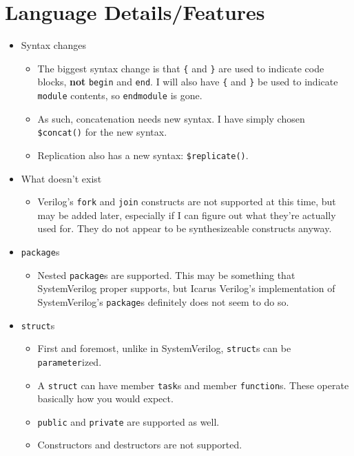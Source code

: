 \documentclass{article}
\begin{document}
	\section{Language Details/Features}
		\begin{itemize}
		\item Syntax changes
			\begin{itemize}
			\item The biggest syntax change is that \texttt{\{} and
			\texttt{\}} are used to indicate code blocks, \textbf{not}
			\texttt{begin} and \texttt{end}.  I will also have \texttt{\{}
			and \texttt{\}} be used to indicate \texttt{module} contents,
			so \texttt{endmodule} is gone.
			\item As such, concatenation needs new syntax.  I have simply
			chosen \texttt{\$concat()} for the new syntax.
			\item Replication also has a new syntax:
			\texttt{\$replicate()}.
			\end{itemize}
		\item What doesn't exist
			\begin{itemize}
			\item Verilog's \texttt{fork} and \texttt{join} constructs are
			not supported at this time, but may be added later, especially
			if I can figure out what they're actually used for.  They do
			not appear to be synthesizeable constructs anyway.
			\end{itemize}
		\item \texttt{package}s
			\begin{itemize}
			\item Nested \texttt{package}s are supported.  This may be
			something that SystemVerilog proper supports, but Icarus
			Verilog's implementation of SystemVerilog's \texttt{package}s
			definitely does not seem to do so.
			\end{itemize}
		\item \texttt{struct}s
			\begin{itemize}
			\item First and foremost, unlike in SystemVerilog,
			\texttt{struct}s can be \texttt{parameter}ized.
			\item A \texttt{struct} can have member \texttt{task}s and
			member \texttt{function}s.  These operate basically how you
			would expect.
			\item \texttt{public} and \texttt{private} are supported as
			well.
			\item Constructors and destructors are not supported.

\end{itemize}
\end{itemize}
\end{document}
